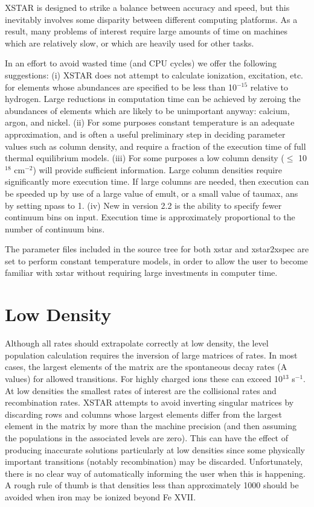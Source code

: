 XSTAR is designed to strike a balance between accuracy and speed,
but this inevitably involves some disparity between different 
computing platforms.  As a result, many problems of interest 
require large amounts of time on machines which are
relatively slow, or which are heavily used for other tasks.  

In an effort to avoid wasted time (and CPU cycles) we offer the 
following suggestions: (i) XSTAR does not attempt to calculate 
ionization, excitation, etc. for elements whose abundances are 
specified to be less than 10$^{-15}$ relative to hydrogen.  
Large reductions in computation time can be achieved by 
zeroing the abundances of elements which are likely to be 
unimportant anyway: calcium, argon, and nickel.  
(ii) For some purposes constant temperature is an adequate
approximation, and is often a useful preliminary step 
in deciding parameter values such as column density, 
and  require a fraction of the execution time of 
full thermal equilibrium models. 
(iii) For some purposes a low column density ($\leq$ 10$^{18}$ cm$^{-2}$)
will provide sufficient information.  Large column densities require
significantly more execution time.  If large columns are needed, then 
execution can be speeded up by use of a large value of emult, or 
a small value of taumax, ans by setting npass to 1. 
(iv) New in version 2.2 is the ability to specify fewer continuum bins 
on input.  Execution time is approximately proportional to the number 
of continuum bins.

The parameter files included in the source tree for both xstar 
and xstar2xspec are set to perform constant temperature models, 
in order to allow the user to become familiar with xstar without 
requiring large investments in computer time.


\section{Low Density}

Although all rates should extrapolate correctly at low density, the 
level population calculation requires the inversion of large matrices 
of rates.  In most cases, the largest elements of the matrix are the 
spontaneous decay rates (A values) for allowed transitions.  For highly 
charged ions these can exceed  10$^{13}$ s$^{-1}$.  At low densities the 
smallest rates of interest are the collisional rates and recombination 
rates.  XSTAR attempts to avoid inverting singular matrices by discarding 
rows and columns whose largest elements differ from the largest element in 
the matrix by more than the machine precision (and then assuming the 
populations in the associated levels are zero).  This can have the effect of 
producing inaccurate solutions particularly at low densities 
since some physically important transitions (notably recombination) 
may be discarded.  Unfortunately, there is no clear way of automatically 
informing the user when this is happening.  A rough rule of thumb is that
densities less than approximately 1000 should be avoided when 
iron may be ionized beyond Fe XVII.  

